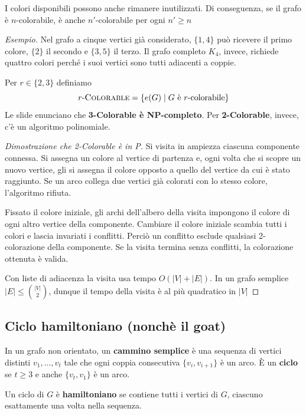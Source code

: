 \medskip
\noindent
I colori disponibili possono anche rimanere inutilizzati.
Di conseguenza, se il grafo è $n$-colorabile, è anche
$n'$-colorabile per ogni $n'\ge n$

\medskip
\noindent
\textit{Esempio.} Nel grafo a cinque vertici già considerato,
$\{1,4\}$ può ricevere il primo colore, $\{2\}$ il secondo
e $\{3,5\}$ il terzo. Il grafo completo $K_4$, invece, richiede
quattro colori perché i suoi vertici sono tutti adiacenti a coppie.

\medskip
\noindent
Per $r\in\{2,3\}$ definiamo
\[
    r\text{-}\textsc{Colorable}=\{e(G)\mid G\text{ è }r\text{-colorabile}\}
\]
Le slide enunciano che \textbf{3-Colorable è NP-completo}.
Per \textbf{2-Colorable}, invece, c'è un algoritmo polinomiale.

\begin{proof}[Dimostrazione che 2-Colorable è in P]
    Si visita in ampiezza ciascuna componente connessa. Si
    assegna un colore al vertice di partenza e, ogni volta che
    si scopre un nuovo vertice, gli si assegna il colore opposto
    a quello del vertice da cui è stato raggiunto. Se un arco
    collega due vertici già colorati con lo stesso colore,
    l'algoritmo rifiuta.

    \noindent
    Fissato il colore iniziale, gli archi dell'albero della
    visita impongono il colore di ogni altro vertice della
    componente. Cambiare il colore iniziale scambia tutti i
    colori e lascia invariati i conflitti. Perciò un conflitto
    esclude qualsiasi 2-colorazione della componente. Se la visita
    termina senza conflitti, la colorazione ottenuta è valida.

    \noindent
    Con liste di adiacenza la visita usa tempo $O(|V|+|E|)$.
    In un grafo semplice $|E|\le\binom{|V|}{2}$, dunque il
    tempo della visita è al più quadratico in $|V|$
\end{proof}

\subsection{Ciclo hamiltoniano (nonchè il goat)} 
In un grafo non orientato, un \textbf{cammino semplice} è una
sequenza di vertici distinti $v_1,\ldots,v_t$ tale che ogni
coppia consecutiva $\{v_i,v_{i+1}\}$ è un arco. È un
\textbf{ciclo} se $t\ge 3$ e anche $\{v_t,v_1\}$ è un arco.

\medskip
\noindent
\colorbox{SALZO}{\parbox{\dimexpr\linewidth-2\fboxsep}{
\begin{definition}
    Un ciclo di $G$ è \textbf{hamiltoniano} se contiene tutti i
    vertici di $G$, ciascuno esattamente una volta nella sequenza.
\end{definition}
}}%

